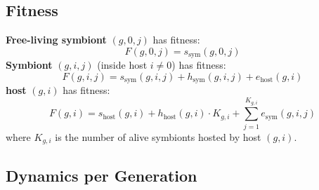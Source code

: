 \documentclass[a4paper]{article}
\begin{document}
\subsection*{Fitness}

\textbf{Free-living symbiont} $(g,0,j)$ has fitness:
\[
F(g,0,j) = s_{\text{sym}}(g,0,j)
\]
\textbf{Symbiont} $(g,i,j)$ (inside host $i \neq 0$) has fitness:
\[
F(g,i,j) = s_{\text{sym}}(g,i,j) + h_{\text{sym}}(g,i,j) + e_{\text{host}}(g,i)
\]
\textbf{host} $(g,i)$ has fitness:
\[
F(g,i) = s_{\text{host}}(g,i) + h_{\text{host}}(g,i) \cdot K_{g,i} + \sum_{j=1}^{K_{g,i}} e_{\text{sym}}(g,i,j)
\]
where $K_{g,i}$ is the number of alive symbionts hosted by host $(g,i)$.

\subsection*{Dynamics per Generation}
\end{document}
